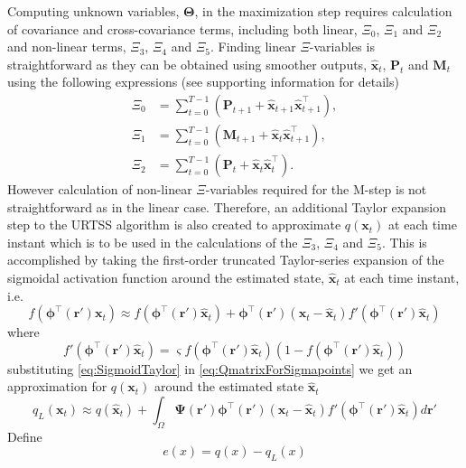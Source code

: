 \documentclass[]{article}
\begin{document}
Computing unknown variables, $\boldsymbol\Theta$, in the maximization step requires calculation of covariance and  cross-covariance terms, including both linear, $\Xi_0$, $\Xi_1$ and $\Xi_2$ and non-linear terms, $\Xi_3$, $\Xi_4$ and  $\Xi_5$. Finding linear $\Xi$-variables is straightforward as they can be obtained using smoother outputs, $\hat{\mathbf x}_t $, $\mathbf P_t$ and $\mathbf M_t$ using the following expressions \cite{Shumway2000} (see supporting information for details)
\begin{align}
	\Xi_{0}&=\sum_{t=0}^{T-1}\left(\mathbf P_{t+1}+\mathbf{\hat x}_{t+1}\mathbf{\hat x}_{t+1}^\top\right)\label{eq:defofXi0}, \\
\Xi_{1}&=\sum_{t=0}^{T-1}\left(\mathbf M_{t+1}+\mathbf{\hat x}_t\mathbf{\hat x}_{t+1}^\top\right) \label{eq:defofXi1}, \\
\Xi_{2}&=\sum_{t=0}^{T-1}\left(\mathbf P_t+\mathbf{\hat x}_t\mathbf{\hat x}_t^\top\right).
 \end{align}
However calculation of non-linear $\Xi$-variables required for the M-step is not straightforward as in the linear case. Therefore, an additional  Taylor expansion step to the URTSS algorithm is also created to approximate $q(\mathbf{x}_t)$ at each time instant which is to be used in the calculations of the $\Xi_3$, $\Xi_4$ and $\Xi_5$. This is accomplished by taking the first-order truncated Taylor-series expansion of the sigmoidal activation function  around the estimated state, $\hat{\mathbf x}_t$ at each time instant, i.e.
\begin{equation}\label{eq:SigmoidTaylor}
 f\left(\boldsymbol \phi^\top\left(\mathbf r'\right)\mathbf x_t\right) \approx f\left(\boldsymbol \phi^\top(\mathbf r')\hat{\mathbf x}_t\right)+  \boldsymbol \phi^\top\left(\mathbf r'\right)\left(\mathbf x_t - \hat{\mathbf x}_t\right)f'\left(\boldsymbol \phi^\top\left(\mathbf r'\right)\hat{\mathbf x}_t\right)
\end{equation}
where 
\begin{equation}\label{eq:SigmoidDerivative}
 f'\left(\boldsymbol \phi^\top\left(\mathbf r'\right)\hat{\mathbf x}_t\right)=\varsigma f\left(\boldsymbol \phi^\top\left(\mathbf r'\right)\hat{\mathbf x}_t\right)\left( 1-f\left( \boldsymbol \phi^\top\left(\mathbf r'\right)\hat{\mathbf x}_t\right)\right)
\end{equation}
substituting \ref{eq:SigmoidTaylor} in \ref{eq:QmatrixForSigmapoints}  we get an approximation for $q(\mathbf x_t)$ around the estimated state $\hat{\mathbf{x}}_t$ 
\begin{equation}\label{eq:qTaylor}
 q_L(\mathbf x_t) \approx q\left(\hat{\mathbf x}_t\right)+\int_\Omega \boldsymbol{\Psi}\left(\mathbf{r}'\right)\boldsymbol \phi^\top\left(\mathbf r'\right) \left(\mathbf x_t -\hat{\mathbf x}_t\right)f'\left(\boldsymbol \phi^\top\left(\mathbf r'\right)\hat{\mathbf x}_t\right) d\mathbf{r}'
\end{equation}
Define
\begin{equation}
	e(x) = q(x) - q_L(x) \nonumber
\end{equation}
\end{document}
